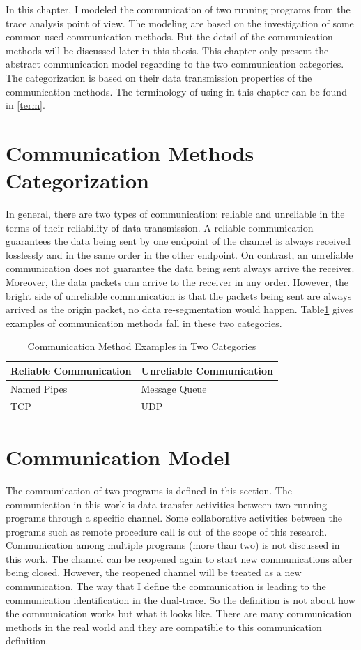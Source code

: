 
\label{chapter:mod}
In this chapter, I modeled the communication of two running programs from the trace analysis point of view. The modeling are based on the investigation of some common used communication methods. But the detail of the communication methods will be discussed later in this thesis. This chapter only present the abstract communication model regarding to the two communication categories. The categorization is based on their data transmission properties of the communication methods. The terminology of using in this chapter can be found in \ref{term}.

\section{Communication Methods Categorization}
In general, there are two types of communication: reliable and unreliable in the terms of their reliability of data transmission. A reliable communication guarantees the data being sent by one endpoint of the channel is always received losslessly and in the same order in the other endpoint. On contrast, an unreliable communication does not guarantee the data being sent always arrive the receiver. Moreover, the data packets can arrive to the receiver in any order. However, the bright side of unreliable communication is that the packets being sent are always arrived as the origin packet, no data re-segmentation would happen. Table\ref{methodsInCategories} gives examples of communication methods fall in these two categories.
\begin{table}[H]
\centering
\caption{Communication Method Examples in Two Categories}
\label{methodsInCategories}
\begin{tabular}{|l|l|}
 \hline
\textbf{Reliable Communication}& \textbf{Unreliable Communication}\\
 \hline
Named Pipes & Message Queue   \\
TCP &  UDP \\
 \hline
\end{tabular}
\end{table}


\section{Communication Model}\label{definition}
The communication of two programs is defined in this section. The communication in this work is data transfer activities between two running programs through a specific channel. Some collaborative activities between the programs such as remote procedure call is out of the scope of this research. Communication among multiple programs (more than two) is not discussed in this work. The channel can be reopened again to start new communications after being closed. However, the reopened channel will be treated as a new communication. The way that I define the communication is leading to the communication identification in the dual-trace. So the definition is not about how the communication works but what it looks like. There are many communication methods in the real world and they are compatible to this communication definition. 


